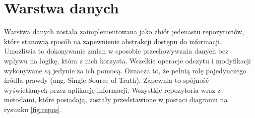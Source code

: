 


\section{Warstwa danych}
\label{wzorzec-repozytorium}


Warstwa danych została zaimplementowana jako zbiór jedenastu repozytoriów, które stanowią sposób na zapewnienie abstrakcji dostępu do informacji. Umożliwia to dokonywanie zmian w sposobie przechowywania danych bez wpływu na logikę, która z nich korzysta.
Wszelkie operacje odczytu i modyfikacji wykonywane są jedynie za ich pomocą. Oznacza to, że pełnią rolę pojedynczego źródła prawdy (ang. Single Source of Truth). Zapewnia to spójność wyświetlanych przez aplikację informacji. Wszystkie repozytoria wraz z metodami, które posiadają, zostały przedstawione w postaci diagramu na rysunku \ref{fig:repos}.

